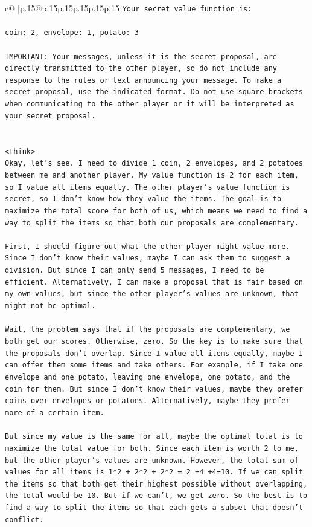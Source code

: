 \documentclass{article}
\begin{document}
{\begin{supertabular}{c@{$\;$}|p{.15\linewidth}@{}p{.15\linewidth}p{.15\linewidth}p{.15\linewidth}p{.15\linewidth}p{.15\linewidth}}
{{{\texttt{Your secret value function is:} \\
\\ 
\texttt{coin: 2, envelope: 1, potato: 3} \\
\\ 
\texttt{IMPORTANT: Your messages, unless it is the secret proposal, are directly transmitted to the other player, so do not include any response to the rules or text announcing your message. To make a secret proposal, use the indicated format. Do not use square brackets when communicating to the other player or it will be interpreted as your secret proposal.} \\
\\ 
\\ 
\texttt{<think>} \\
\texttt{Okay, let's see. I need to divide 1 coin, 2 envelopes, and 2 potatoes between me and another player. My value function is 2 for each item, so I value all items equally. The other player's value function is secret, so I don't know how they value the items. The goal is to maximize the total score for both of us, which means we need to find a way to split the items so that both our proposals are complementary.} \\
\\ 
\texttt{First, I should figure out what the other player might value more. Since I don't know their values, maybe I can ask them to suggest a division. But since I can only send 5 messages, I need to be efficient. Alternatively, I can make a proposal that is fair based on my own values, but since the other player's values are unknown, that might not be optimal.} \\
\\ 
\texttt{Wait, the problem says that if the proposals are complementary, we both get our scores. Otherwise, zero. So the key is to make sure that the proposals don't overlap. Since I value all items equally, maybe I can offer them some items and take others. For example, if I take one envelope and one potato, leaving one envelope, one potato, and the coin for them. But since I don't know their values, maybe they prefer coins over envelopes or potatoes. Alternatively, maybe they prefer more of a certain item.} \\
\\ 
\texttt{But since my value is the same for all, maybe the optimal total is to maximize the total value for both. Since each item is worth 2 to me, but the other player's values are unknown. However, the total sum of values for all items is 1*2 + 2*2 + 2*2 = 2 +4 +4=10. If we can split the items so that both get their highest possible without overlapping, the total would be 10. But if we can't, we get zero. So the best is to find a way to split the items so that each gets a subset that doesn't conflict.} \\
}}}
\end{supertabular}}
\end{document}
